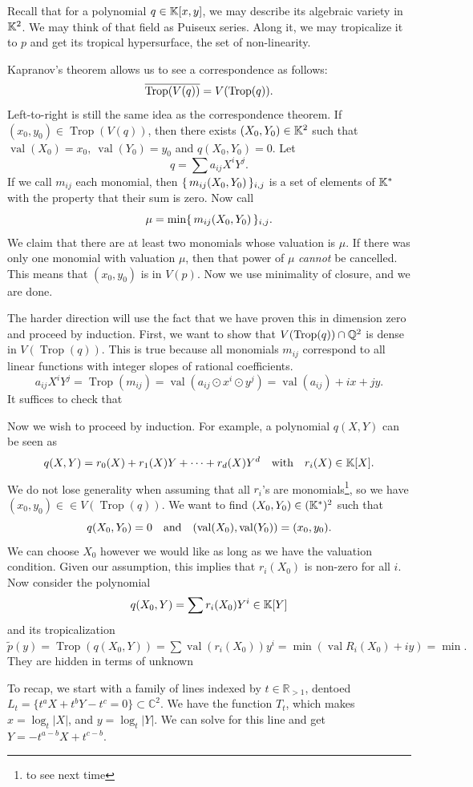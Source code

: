 \documentclass[12pt]{memoir}
\DeclareMathOperator{\val}{val}
\DeclareMathOperator{\Trop}{Trop}
\theoremstyle{definition}
\def\RR{{\mathbb R}}
\def\CC{{\mathbb C}}
\begin{document}
Recall that for a polynomial $q\in\mathbb{K}[x,y]$, we may describe its algebraic variety in $\mathbb{K}^2$. We may think of that field as Puiseux series. Along it, we may tropicalize it to $p$ and get its tropical hypersurface, the set of non-linearity.\par
Kapranov's theorem allows us to see a correspondence as follows:
$$\ov{\Trop(V(q))}=V(\Trop(q)).$$
Left-to-right is still the same idea as the correspondence theorem. If $(x_0,y_0)\in\Trop(V(q))$, then there exists $(X_0,Y_0)\in\mathbb{K}^2$ such that $\val(X_0)=x_0,\ \val(Y_0)=y_0$ and $q(X_0,Y_0)=0$. Let 
$$q=\sum a_{ij}X^iY^j.$$
If we call $m_{ij}$ each monomial, then $\{\,m_{ij}(X_0,Y_0)\,\}_{i,j}$ is a set of elements of $\mathbb{K}^\ast$ with the property that their sum is zero. Now call 
$$\mu=\min\{\,m_{ij}(X_0,Y_0)\,\}_{i,j}.$$
We claim that there are at least two monomials whose valuation is $\mu$. If there was only one monomial with valuation $\mu$, then that power of $\mu$ \emph{cannot} be cancelled. This means that $(x_0,y_0) $ is in $V(p)$. Now we use minimality of closure, and we are done.\par 
The harder direction will use the fact that we have proven this in dimension zero and proceed by induction. First, we want to show that $V(\Trop(q))\cap\bQ^2$ is dense in $V(\Trop(q))$. This is true because all monomials $m_{ij}$ correspond to all linear functions with integer slopes of rational coefficients.
$$a_{ij}X^iY^j=\Trop(m_{ij})=\val(a_{ij}\odot x^{i}\odot y^j)=\val(a_{ij})+ix+jy.$$
It suffices to check that \par 
Now we wish to proceed by induction. For example, a polynomial $q(X,Y)$ can be seen as 
$$q(X,Y)=r_0(X)+r_1(X)Y+\dots+r_d(X)Y^d\quad\text{with}\quad r_i(X)\in\mathbb{K}[X].$$
We do not lose generality when assuming that all $r_i$'s are monomials\footnote{to see next time}, so we have $(x_0,y_0)\in\in V(\Trop(q))$. We want to find $(X_0,Y_0)\in(\mathbb{K}^\ast)^2$ such that 
$$q(X_0,Y_0)=0\word{and}(\val(X_0),\val(Y_0))=(x_0,y_0).$$
We can choose $X_0$ however we would like as long as we have the valuation condition. Given our assumption, this implies that $r_i(X_0)$ is non-zero for all $i$. Now consider the polynomial 
$$q(X_0,Y)=\sum r_i(X_0)Y^i\in\mathbb{K}[Y]$$
and its tropicalization
$\tilde{p}(y)=\Trop(q(X_0,Y))=\sum\val(r_i(X_0))y^i=\min(\val R_i(X_0)+iy)=\min.$
They are hidden in terms of unknown 




To recap, we start with a family of lines indexed by $t \in \RR_{>1}$, dentoed $L_t= \{t^aX + t^bY -t^c=0\} \subset \CC^2$. We have the function $ T_t$, which makes $x= \log_t|X|$, and $y=\log_t|Y|$. We can solve for this line and get $Y= -t^{a-b}X + t^{c-b}$.
\end{document}
